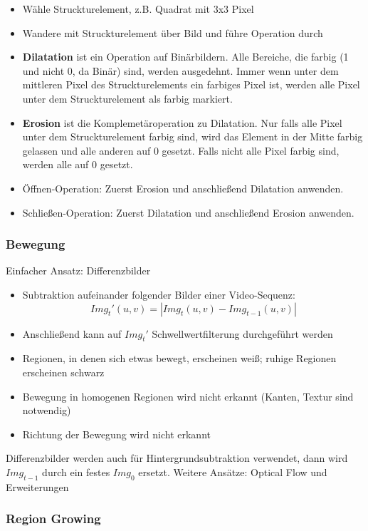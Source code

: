 \begin{itemize}
\item Wähle Struckturelement, z.B. Quadrat mit 3x3 Pixel
\item Wandere mit Struckturelement über Bild und führe Operation durch
\item \textbf{Dilatation} ist ein Operation auf Binärbildern. Alle Bereiche, die farbig (1 und nicht 0, da Binär) sind, werden ausgedehnt. Immer wenn unter dem mittleren Pixel des Struckturelements ein farbiges Pixel ist, werden alle Pixel unter dem Struckturelement als farbig markiert.
\item \textbf{Erosion} ist die Komplemetäroperation zu Dilatation. Nur falls alle Pixel unter dem Struckturelement farbig sind, wird das Element in der Mitte farbig gelassen und alle anderen auf 0 gesetzt. Falls nicht alle Pixel farbig sind, werden alle auf 0 gesetzt.
\item Öffnen-Operation: Zuerst Erosion und anschließend Dilatation anwenden.
\item Schließen-Operation: Zuerst Dilatation und anschließend Erosion anwenden.

\end{itemize}


\subsubsection{Bewegung}

Einfacher Ansatz: Differenzbilder
\begin{itemize}
\item Subtraktion aufeinander folgender Bilder einer Video-Sequenz: $$Img_t'(u,v) = |Img_t(u,v) - Img_{t-1}(u,v)|$$
\item Anschließend kann auf $Img_t'$ Schwellwertfilterung durchgeführt werden
\item Regionen, in denen sich etwas bewegt, erscheinen weiß; ruhige Regionen erscheinen schwarz
\item Bewegung in homogenen Regionen wird nicht erkannt (Kanten, Textur sind notwendig)
\item Richtung der Bewegung wird nicht erkannt
\end{itemize}
Differenzbilder werden auch für Hintergrundsubtraktion verwendet, dann wird $Img_{t-1}$ durch ein festes $Img_0$ ersetzt. Weitere Ansätze: Optical Flow und Erweiterungen

\subsubsection{Region Growing}

